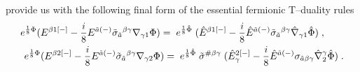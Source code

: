 \documentclass[a4paper,11pt]{article}
\begin{document}
provide us with 
the following  final form of the essential fermionic 
T--duality rules  
\begin{eqnarray}\label{Td-EhE1}
e^{{1\over 8}{\Phi}} 
({E}^{ {\beta}1[-]} - {i \over 8} 
{E}^{ {\tilde{a}}(-)} 
\tilde{\sigma}_{ {\tilde{a}}}{}^{ {\beta} {\gamma}}
{\nabla}_{ {\gamma}1}{\Phi}) 
= \;  e^{{1\over 8}\hat{\Phi}}\; 
(\hat{E}^{{\beta}1[-]} - {i \over 8} \hat{E}^{ {\tilde{a}}(-)}
\tilde{\sigma}_{ {\tilde{a}}}{}^{ {\beta} {\gamma}}
\hat{\nabla}_{ {\gamma}1}\hat{\Phi}) 
\; , \qquad \\  
\label{Td-EhE2} 
e^{{1\over 8}{\Phi}} 
({E}^{ {\beta}2[-]}
- {i \over 8} 
{E}^{ {\tilde{a}}(-)} 
\tilde{\sigma}_{ {\tilde{a}}}{}^{ {\beta} {\gamma}}
{\nabla}_{ {\gamma}2}{\Phi})
= \; e^{{1\over 8}\hat{\Phi}}\;  
\tilde{\sigma}^{ {\#} {\beta} {\gamma}}
\; ( \hat{E}_{ {\gamma}}^{2[-]}  - {i \over 8}  
\hat{E}^{{\tilde{a}}(-)}
{\sigma}_{\tilde{ {a}} {\beta} {\gamma}}
\hat{\nabla}^{ {\gamma}}_2\hat{\Phi}) \; . 
\end{eqnarray}
\end{document}
